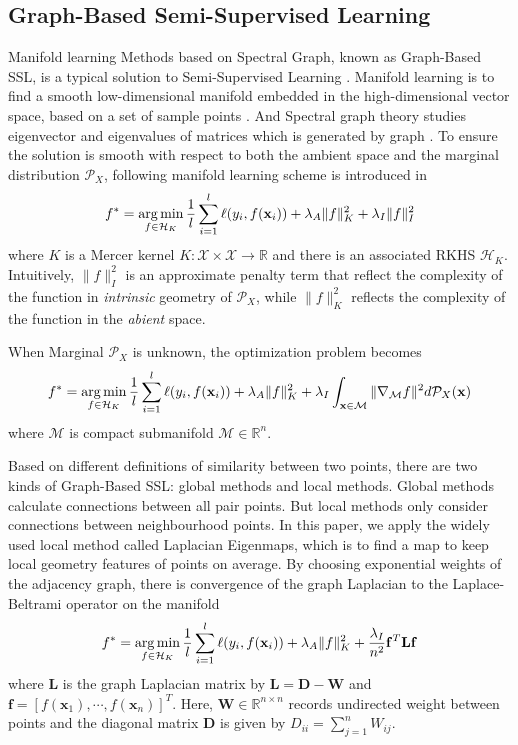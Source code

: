\documentclass{article}
\newcommand{\argmin}{\operatornamewithlimits{arg\,min}}
\begin{document}
\subsection{Graph-Based Semi-Supervised Learning}
Manifold learning Methods based on Spectral Graph, known as Graph-Based SSL, is a typical solution to Semi-Supervised Learning
\cite{belkin2006manifold,chapelle2009semi,subramanya2014graph}.
Manifold learning is to find a smooth low-dimensional manifold embedded in the high-dimensional vector space, based on a set of sample points \cite{boothby1986introduction}.
And Spectral graph theory studies eigenvector and eigenvalues of matrices which is generated by graph \cite{chung1997spectral}.
To ensure the solution is smooth with respect to both the ambient space and the marginal distribution $\mathcal{P}_X$,
following manifold learning scheme is introduced in \cite{belkin2006manifold}
\begin{align*}
f^\ast=\argmin \limits_{f \in \mathcal{H}_K}
\frac{1}{l} \sum_{i=1}^l \ell(y_i, f(\mathbf{x}_i))
+\lambda_A\|f\|_K^2
+\lambda_I\|f\|_I^2
\end{align*}
where $K$ is a Mercer kernel $K:\mathcal{X} \times \mathcal{X} \to \mathbb{R}$ and there is an associated RKHS $\mathcal{H}_K$.
Intuitively, $\|f\|_I^2$ is an approximate penalty term that reflect the complexity of the function in \emph{intrinsic} geometry of $\mathcal{P}_X$,
while $\|f\|_K^2$ reflects the complexity of the function in the \emph{abient} space.

When Marginal $\mathcal{P}_X$ is unknown, the optimization problem becomes
\begin{align*}
f^\ast=\argmin \limits_{f \in \mathcal{H}_K}
\frac{1}{l} \sum_{i=1}^l \ell(y_i, f(\mathbf{x}_i))
+\lambda_A\|f\|_K^2
+\lambda_I \int_{\mathbf{x} \in \mathcal{M}} \|\nabla_\mathcal{M}f\|^2 d\mathcal{P}_X(\mathbf{x})
\end{align*}
where $\mathcal{M}$ is compact submanifold $\mathcal{M} \in \mathbb{R}^n$.

Based on different definitions of similarity between two points, there are two kinds of Graph-Based SSL: global methods and local methods.
Global methods calculate connections between all pair points. But local methods only consider connections between neighbourhood points.
In this paper, we apply the widely used local method called Laplacian Eigenmaps,
which is to find a map to keep local geometry features of points on average.
By choosing exponential weights of the adjacency graph, there is convergence of the graph Laplacian to the Laplace-Beltrami operator on the manifold
\begin{align}\label{mani_opt1}
f^\ast=\argmin \limits_{f \in \mathcal{H}_K}
\frac{1}{l} \sum_{i=1}^l \ell(y_i, f(\mathbf{x}_i))
+\lambda_A\|f\|_K^2
+\frac{\lambda_I }{n^2} \mathbf{f}^T \mathbf{L} \mathbf{f}
\end{align}
where $\mathbf{L}$ is the graph Laplacian matrix by $\mathbf{L}=\mathbf{D}-\mathbf{W}$
and $\mathbf{f}=[f(\mathbf{x}_1), \cdots, f(\mathbf{x}_{n})]^T$.
Here, $\mathbf{W} \in \mathbb{R}^{n \times n}$ records undirected weight between points
and the diagonal matrix $\mathbf{D}$ is given by $D_{ii}=\sum_{j=1}^n W_{ij}$.
\end{document}
